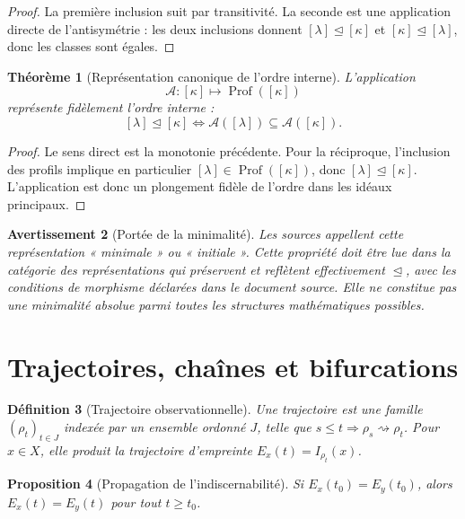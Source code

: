 \documentclass[11pt,a4paper,openany]{book}
\newtheorem{definition}{Définition}[chapter]
\newtheorem{proposition}[definition]{Proposition}
\newtheorem{theorem}[definition]{Théorème}
\newtheorem{warning}[definition]{Avertissement}
\begin{document}
\begin{proof}
La première inclusion suit par transitivité. La seconde est une application directe de l'antisymétrie : les deux inclusions donnent \([\lambda]\trianglelefteq[\kappa]\) et \([\kappa]\trianglelefteq[\lambda]\), donc les classes sont égales.
\end{proof}

\begin{theorem}[Représentation canonique de l'ordre interne]
L'application
\[
\mathcal A:[\kappa]\longmapsto\operatorname{Prof}([\kappa])
\]
représente fidèlement l'ordre interne :
\[
[\lambda]\trianglelefteq[\kappa]
\Longleftrightarrow
\mathcal A([\lambda])\subseteq\mathcal A([\kappa]).
\]
\end{theorem}

\begin{proof}
Le sens direct est la monotonie précédente. Pour la réciproque, l'inclusion des profils implique en particulier \([\lambda]\in\operatorname{Prof}([\kappa])\), donc \([\lambda]\trianglelefteq[\kappa]\). L'application est donc un plongement fidèle de l'ordre dans les idéaux principaux.
\end{proof}

\begin{warning}[Portée de la minimalité]
Les sources appellent cette représentation « minimale » ou « initiale ». Cette propriété doit être lue dans la catégorie des représentations qui préservent et reflètent effectivement \(\trianglelefteq\), avec les conditions de morphisme déclarées dans le document source. Elle ne constitue pas une minimalité absolue parmi toutes les structures mathématiques possibles.
\end{warning}

\section{Trajectoires, chaînes et bifurcations}

\begin{definition}[Trajectoire observationnelle]
Une trajectoire est une famille \((\rho_t)_{t\in J}\) indexée par un ensemble ordonné \(J\), telle que \(s\le t\Rightarrow\rho_s\rightsquigarrow\rho_t\). Pour \(x\in X\), elle produit la trajectoire d'empreinte \(E_x(t)=I_{\rho_t}(x)\).
\end{definition}

\begin{proposition}[Propagation de l'indiscernabilité]
Si \(E_x(t_0)=E_y(t_0)\), alors \(E_x(t)=E_y(t)\) pour tout \(t\ge t_0\).
\end{proposition}
\end{document}
